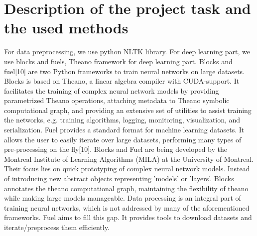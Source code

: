 \documentclass[runningheads,a4paper]{llncs}
\begin{document}
\section{Description of the project task and the used methods}
For data preprocessing, we use python NLTK library.
For deep learning part, we use blocks and fuels, Theano framework for deep learning part. 
Blocks and fuel[10] are two Python frameworks to train neural networks on large datasets. Blocks is based on Theano, a linear algebra compiler with CUDA-support. It facilitates the training of complex neural network models by providing parametrized Theano operations, attaching metadata to Theano symbolic computational graph, and providing an extensive set of utilities to assist training the networks, e.g. training algorithms, logging, monitoring, visualization, and serialization. Fuel provides a standard format for machine learning datasets. It allows the user to easily iterate over large datasets, performing many types of pre-processing on the fly[10].
Blocks and Fuel are being developed by the Montreal Institute of Learning Algorithms (MILA) at the University of Montreal. Their focus lies on quick prototyping of complex neural network models. 
Instead of introducing new abstract objects representing 'models' or 'layers'. Blocks annotates the theano computational graph, maintaining the flexibility of theano while making large models manageable. 
Data processing is an integral part of training neural networks, which is not addressed by many of the aforementioned frameworks. Fuel aims to fill this gap. It provides tools to download datasets and iterate/preprocess them efficiently. 
\end{document}
